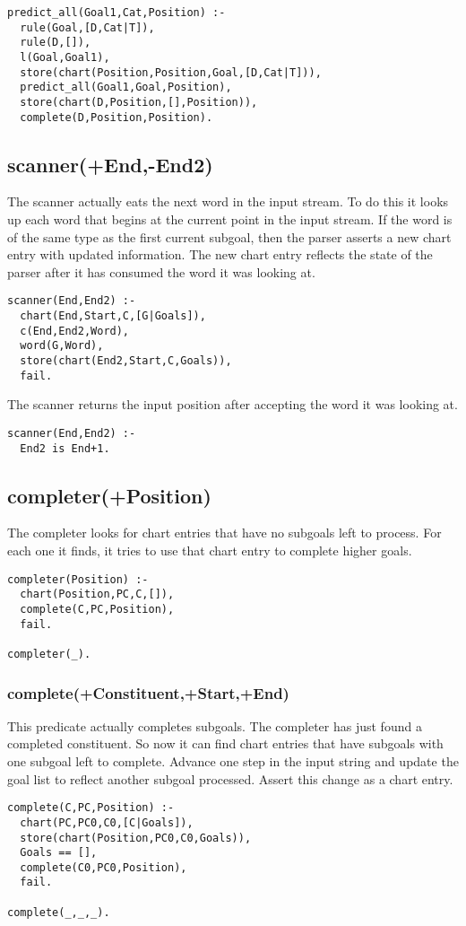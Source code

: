 \documentclass[12pt]{article}
\begin{document}
\begin{verbatim}
predict_all(Goal1,Cat,Position) :-
  rule(Goal,[D,Cat|T]),
  rule(D,[]),
  l(Goal,Goal1),
  store(chart(Position,Position,Goal,[D,Cat|T])),
  predict_all(Goal1,Goal,Position),
  store(chart(D,Position,[],Position)),
  complete(D,Position,Position).
\end{verbatim}


\subsection{scanner(+End,-End2)}
The scanner actually eats the next word in the input stream. To do this it looks up each word that begins at the current point in the input stream. If the word is of the same type as the first current subgoal, then the parser asserts a new chart entry with updated information. The new chart entry reflects the state of the parser after it has consumed the word it was looking at.
\begin{verbatim}
scanner(End,End2) :-
  chart(End,Start,C,[G|Goals]),
  c(End,End2,Word),
  word(G,Word),
  store(chart(End2,Start,C,Goals)),
  fail.
\end{verbatim}
The scanner returns the input position after accepting the word it was looking at.
\begin{verbatim}
scanner(End,End2) :-
  End2 is End+1.
\end{verbatim}

\subsection{completer(+Position)}
The completer looks for chart entries that have no subgoals left to process.  For each one it finds, it tries to use that chart entry to complete higher goals.

\begin{verbatim}
completer(Position) :-
  chart(Position,PC,C,[]),
  complete(C,PC,Position),
  fail.

completer(_).
\end{verbatim}

\subsubsection{complete(+Constituent,+Start,+End)}
This predicate actually completes subgoals.  The completer has just found a completed constituent.  So now it can find chart entries that have subgoals with one subgoal left to complete.  Advance one step in the input string and update the goal list to reflect another subgoal processed.  Assert this change as a chart entry.
\begin{verbatim}
complete(C,PC,Position) :-
  chart(PC,PC0,C0,[C|Goals]),
  store(chart(Position,PC0,C0,Goals)),
  Goals == [],
  complete(C0,PC0,Position),
  fail.

complete(_,_,_).

\end{verbatim}
\end{document}
